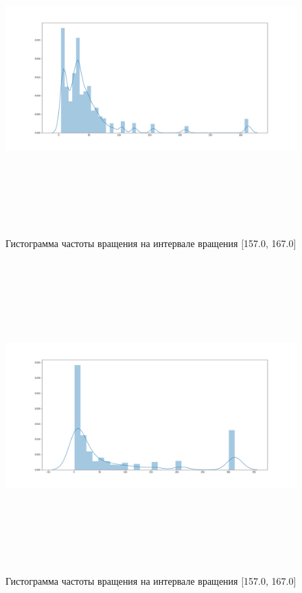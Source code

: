 \documentclass[a4paper,12pt]{article} %
\begin{document}
	\begin{figure}[H]		
		\includegraphics[width = 18cm, height = 12cm]{rot_filtered_hist.png}
		\caption{Гистограмма частоты вращения на интервале вращения [157.0, 167.0]}
		\label{fig:rot_filtered_hist}
	\end{figure}
	
	\begin{figure}[H]		
		\includegraphics[width = 18cm, height = 12cm]{fluct_filtered_hist.png}
		\caption{Гистограмма частоты вращения на интервале вращения [157.0, 167.0]}
		\label{fig:fluct_filtered_hist}
	\end{figure}
	
\end{document}
